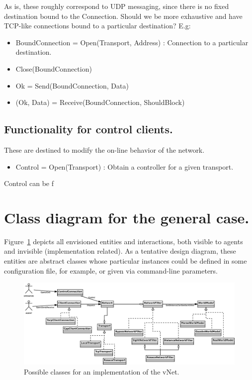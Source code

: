 \documentclass[a4paper,11pt]{article}
\begin{document}
As is, these roughly correspond to UDP messaging, since there is no fixed
destination bound to the Connection. Should we be more exhaustive and have
TCP-like connections bound to a particular destination? E.g:

\begin{itemize}
    \item BoundConnection = Open(Transport, Address) : Connection to a
particular destination.
    \item Close(BoundConnection)
    \item Ok = Send(BoundConnection, Data)
    \item (Ok, Data) = Receive(BoundConnection, ShouldBlock)
\end{itemize}

\subsection{Functionality for control clients.}

These are destined to modify the on-line behavior of the network.

\begin{itemize}
    \item Control = Open(Transport) : Obtain a controller for a given transport.
\end{itemize}

Control can be f

\section{Class diagram for the general case.}

Figure~\ref{fig:classes} depicts all envisioned entities and interactions, both visible to agents and invisible (implementation related). As a tentative design diagram, these entities are abstract classes whose particular instances could be defined in some configuration file, for example, or given via command-line parameters.

\begin{figure}
\begin{center}
\includegraphics[width=0.999\columnwidth]{figures/classes}
\end{center}
\caption{Possible classes for an implementation of the vNet.}
\label{fig:classes}
\end{figure}
\end{document}
